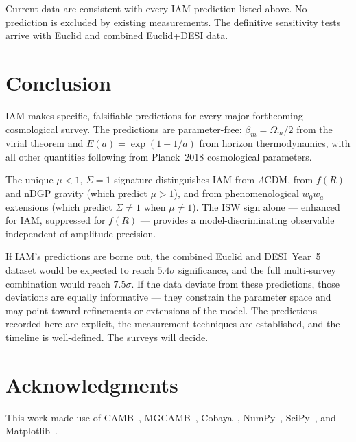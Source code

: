 \documentclass[12pt,a4paper]{article}
\begin{document}
Current data are consistent with every IAM prediction listed above. No prediction
is excluded by existing measurements. The definitive sensitivity tests arrive with
Euclid and combined Euclid+DESI data.

\section{Conclusion}

IAM makes specific, falsifiable predictions for every major forthcoming
cosmological survey. The predictions are parameter-free: $\beta_m = \Omega_m/2$
from the virial theorem and $E(a) = \exp(1-1/a)$ from horizon thermodynamics,
with all other quantities following from Planck~2018 cosmological parameters.

The unique $\mu < 1$, $\Sigma = 1$ signature distinguishes IAM from $\Lambda$CDM,
from $f(R)$ and nDGP gravity (which predict $\mu > 1$), and from phenomenological
$w_0 w_a$ extensions (which predict $\Sigma \neq 1$ when $\mu \neq 1$). The ISW
sign alone --- enhanced for IAM, suppressed for $f(R)$ --- provides a
model-discriminating observable independent of amplitude precision.

If IAM's predictions are borne out, the combined Euclid and DESI~Year~5 dataset
would be expected to reach $5.4\sigma$ significance, and the full multi-survey
combination would reach $7.5\sigma$. If the data deviate from these predictions,
those deviations are equally informative --- they constrain the parameter space
and may point toward refinements or extensions of the model. The predictions
recorded here are explicit, the measurement techniques are established, and
the timeline is well-defined. The surveys will decide.

\section*{Acknowledgments}

This work made use of CAMB~\citep{Lewis2000}, MGCAMB~\citep{Zucca2019},
Cobaya~\citep{Torrado2021}, NumPy~\citep{Harris2020}, SciPy~\citep{Virtanen2020},
and Matplotlib~\citep{Hunter2007}.
\end{document}
